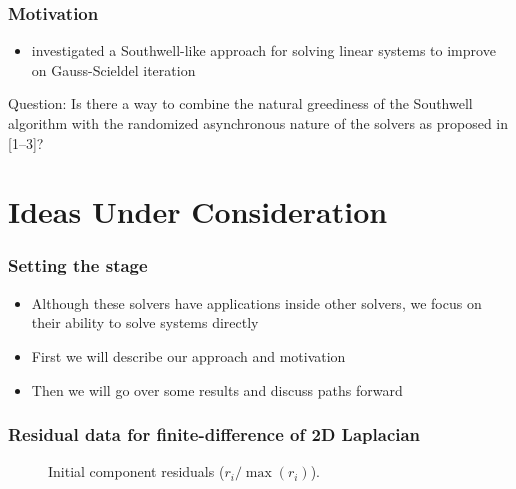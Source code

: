 \documentclass{beamer}
\begin{document}
\begin{frame}
	\frametitle{Motivation}
	\begin{itemize}
		\item \textcite{wolfson2017distributed} investigated  a Southwell-like approach for solving linear systems to improve on Gauss-Scieldel iteration
	\end{itemize}	
	\begin{block}{Question:}
	    Is there a way to combine the natural greediness of the Southwell algorithm with the randomized asynchronous nature of the solvers as proposed in [1--3]?
	\end{block}
\end{frame}


\section{Ideas Under Consideration}

\begin{frame}
	\frametitle{Setting the stage}
	\begin{itemize}
		\item Although these solvers have applications inside other solvers, we focus on their ability to solve systems directly
        \item First we will describe our approach and motivation
        \item Then we will go over some results and discuss paths forward
	\end{itemize}
\end{frame}

\begin{frame}
	\frametitle{Residual data for finite-difference of 2D Laplacian}
	\begin{figure}[H]
		\centering
		\caption{Initial component residuals ($r_i / \max (r_i)$).}
		\label{fig:initial-residuals-laplacian}
	\end{figure}
\end{frame}
\end{document}
